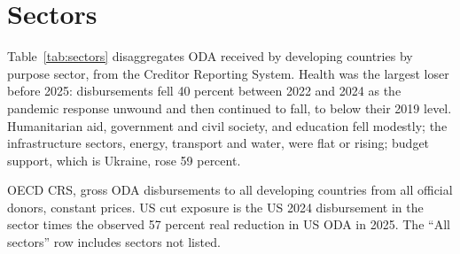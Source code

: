 \documentclass[AER]{AEA}
\begin{document}
\section{Sectors}\label{sec:sectors}

Table~\ref{tab:sectors} disaggregates ODA received by developing countries by purpose sector, from the Creditor Reporting System. Health was the largest loser before 2025: disbursements fell 40 percent between 2022 and 2024 as the pandemic response unwound and then continued to fall, to below their 2019 level. Humanitarian aid, government and civil society, and education fell modestly; the infrastructure sectors, energy, transport and water, were flat or rising; budget support, which is Ukraine, rose 59 percent.

\begin{table}
\caption{ODA received by developing countries by sector, constant USD billion}\label{tab:sectors}
\begin{tablenotes}
OECD CRS, gross ODA disbursements to all developing countries from all official donors, constant prices. US cut exposure is the US 2024 disbursement in the sector times the observed 57 percent real reduction in US ODA in 2025. The ``All sectors'' row includes sectors not listed.
\end{tablenotes}
\end{table}
\end{document}
